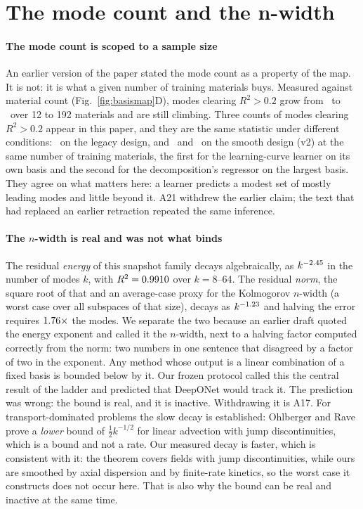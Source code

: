 \section{The mode count and the n-width}
\label{s2:sec7}

\paragraph{The mode count is scoped to a sample size} An
earlier version of the paper stated the mode count as a property of the map. It
is not: it is what a given number of training materials buys. Measured against
material count (Fig.~\ref{fig:basismap}D), modes clearing \(R^2 > 0.2\) grow from \nLCmodesSmall\ to
\nLCmodesLarge\ over 12 to 192 materials and are still climbing. Three counts of
modes clearing \(R^2 > 0.2\) appear in this paper, and they are the same statistic
under different conditions: \nLfiveCountModes\ on the legacy design, and
\nLCmodesLarge\ and \nLfiveVtwoModes\ on the smooth design (v2) at the same number of training
materials, the first for the learning-curve learner on its own basis and the second for the
decomposition's regressor on the largest basis. They agree on what matters here:
a learner predicts a modest set of mostly leading modes and little beyond it. A21 withdrew the earlier claim; the text that had replaced an
earlier retraction repeated the same inference.

\paragraph{The \(n\)-width is real and was not what binds} The residual
\emph{energy} of this snapshot family decays algebraically, as
\(k^{-2.45}\) in the number of modes \(k\), with \(R^2 = 0.9910\) over
\(k = 8\)--64. The residual \emph{norm}, the square root of that and an average-case proxy for the
Kolmogorov \(n\)-width (a worst case over all subspaces of that size), decays as \(k^{-1.23}\)
and halving the error requires
\(1.76\times\) the modes. We separate the two because an
earlier draft quoted the energy exponent and called it the \(n\)-width, next to a
halving factor computed correctly from the norm: two numbers in one sentence
that disagreed by a factor of two in the exponent. Any method whose output is a linear
combination of a fixed basis is bounded below by it. Our frozen protocol called this
the central result of the ladder and predicted that DeepONet would track it.
The prediction was wrong: the bound is real, and it is inactive. Withdrawing it is
A17. For transport-dominated problems the slow decay is established: Ohlberger
and Rave \cite{ohlberger2016reduced} prove a \emph{lower} bound of \(\tfrac12 k^{-1/2}\) for linear advection
with jump discontinuities, which is a bound and not a rate. Our measured decay is faster, which is consistent with it:
the theorem covers fields with jump discontinuities, while ours are smoothed by axial
dispersion and by finite-rate kinetics, so the worst case it constructs does not occur
here. That is also why the bound can be real and inactive at the same time.

